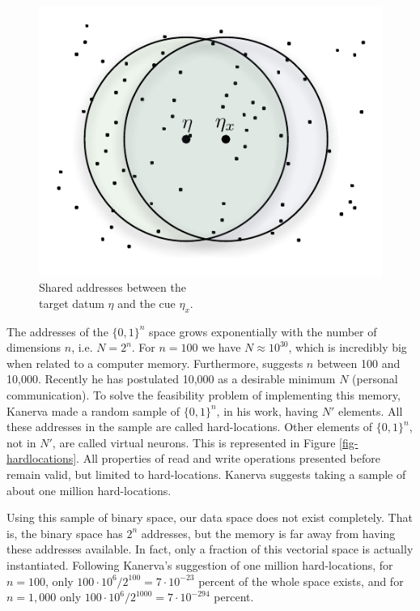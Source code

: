 \begin{figure}[h]
\centering\includegraphics[scale=0.75]{./images02/p1_inter_p2.pdf}

\caption{Shared addresses between the \protect \\
target datum $\eta$ and the cue $\eta_{x}$. \label{fig-shared-addresses}}
\end{figure}


The addresses of the $\{0,1\}^{n}$ space grows exponentially with the number of dimensions $n$, i.e. $N=2^{n}$. For $n=100$ we have $N\approx10^{30}$, which is incredibly big when related to a computer memory. Furthermore, \citet{Kanerva1988} suggests $n$ between 100 and 10,000. Recently he has postulated 10,000 as a desirable minimum $N$ (personal communication). To solve the feasibility problem of implementing this memory, Kanerva made a random sample of $\{0,1\}^{n}$, in his work, having $N'$ elements. All these addresses in the sample are called hard-locations. Other elements of $\{0,1\}^{n}$, not in $N'$, are called virtual neurons. This is represented in Figure \ref{fig-hardlocations}.  All properties of read and write operations presented before remain valid, but limited to hard-locations. Kanerva suggests taking a sample of about one million hard-locations.

Using this sample of binary space, our data space does not exist completely.  That is, the binary space has $2^{n}$ addresses, but the memory is far away from having these addresses available. In fact, only a fraction of this vectorial space is actually instantiated. Following Kanerva's suggestion of one million hard-locations, for $n=100$, only $100\cdot10^{6}/2^{100}=7\cdot10^{-23}$ percent of the whole space exists, and for $n=1,000$ only $100\cdot10^{6}/2^{1000}=7\cdot10^{-294}$ percent.

